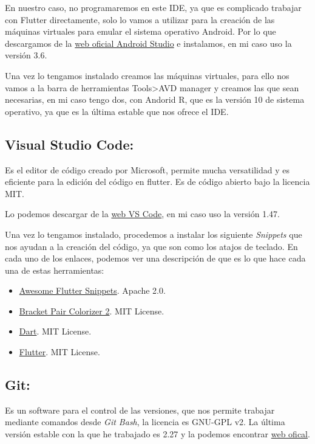 En nuestro caso, no programaremos en este IDE, ya que es complicado trabajar con Flutter directamente, solo lo vamos a utilizar para la creación de las máquinas virtuales para emular el sistema operativo Android. Por lo que descargamos de la \href{https://developer.android.com/studio}{web oficial Android Studio} e instalamos, en mi caso uso la versión 3.6.

Una vez lo tengamos instalado creamos las máquinas virtuales, para ello nos vamos a la barra de herramientas Tools>AVD manager y creamos las que sean necesarias, en mi caso tengo dos, con Andorid R, que es la versión 10 de sistema operativo, ya que es la última estable que nos ofrece el IDE.

\subsection{Visual Studio Code:}
Es el editor de código creado por Microsoft, permite mucha versatilidad y es eficiente para la edición del código en flutter. Es de código abierto bajo la licencia MIT.

Lo podemos descargar de la \href{https://code.visualstudio.com/}{web VS Code}, en mi caso uso la versión 1.47.

Una vez lo tengamos instalado, procedemos a instalar los siguiente \emph{Snippets} que nos ayudan a la creación del código, ya que son como los atajos de teclado. En cada uno de los enlaces, podemos ver una descripción de que es lo que hace cada una de estas herramientas:

\begin{itemize}
	\tightlist
	\item \href{https://marketplace.visualstudio.com/items?itemName=Nash.awesome-flutter-snippets}{Awesome Flutter Snippets}. Apache 2.0.
	\item \href{https://marketplace.visualstudio.com/items?itemName=CoenraadS.bracket-pair-colorizer-2}{Bracket Pair Colorizer 2}. MIT License.
	\item \href{https://marketplace.visualstudio.com/items?itemName=Dart-Code.dart-code}{Dart}. MIT License.
	\item \href{https://marketplace.visualstudio.com/items?itemName=Dart-Code.flutter}{Flutter}. MIT License.
\end{itemize}

\subsection{Git:}
Es un software para el control de las versiones, que nos permite trabajar mediante comandos desde \emph{Git Bash}, la licencia es GNU-GPL v2.  La última versión estable con la que he trabajado es 2.27 y la podemos encontrar \href{https://git-scm.com/}{web ofical}.

